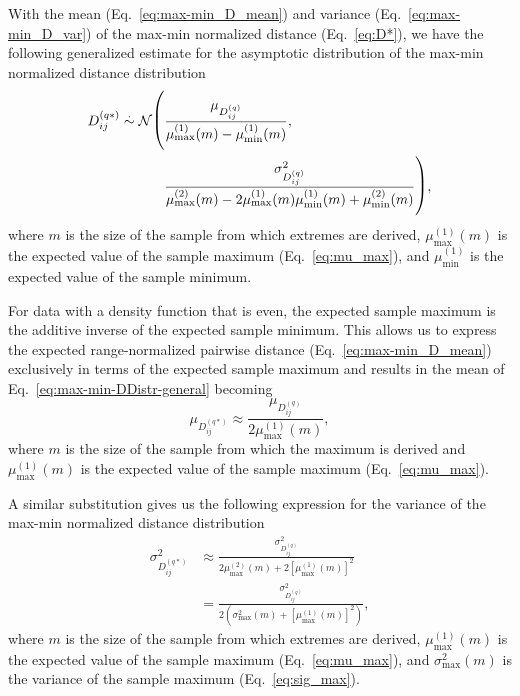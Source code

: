\documentclass[aos]{imsart}
\begin{document}
With the mean (Eq.~\ref{eq:max-min_D_mean}) and variance (Eq.~\ref{eq:max-min_D_var}) of the max-min normalized distance (Eq.~\ref{eq:D*}), we have the following generalized estimate for the asymptotic distribution of the max-min normalized distance distribution
%
\begin{equation}\label{eq:max-min-DDistr-general}
\begin{aligned}
D^{(q*)}_{ij} \overset{.}{\sim} \mathcal{N}{\fontsize{0.5cm}{1pt}\selectfont \Biggl(}&\frac{\mu_{D^{(q)}_{ij}}}{\mu^{(1)}_\text{max}(m) - \mu^{(1)}_\text{min}(m)}, \\
&\frac{\sigma^2_{D^{(q)}_{ij}}}{\mu^{(2)}_\text{max}(m) - 2 \mu^{(1)}_\text{max}(m) \mu^{(1)}_\text{min}(m) + \mu^{(2)}_\text{min}(m)}{\fontsize{0.5cm}{1pt}\selectfont \Biggr)},
\end{aligned}
\end{equation}
%
where $m$ is the size of the sample from which extremes are derived, $\mu^{(1)}_\text{max}(m)$ is the expected value of the sample maximum (Eq.~\ref{eq:mu_max}), and $\mu^{(1)}_\text{min}$ is the expected value of the sample minimum.

For data with a density function that is even, the expected sample maximum is the additive inverse of the expected sample minimum. This allows us to express the expected range-normalized pairwise distance (Eq.~\ref{eq:max-min_D_mean}) exclusively in terms of the expected sample maximum and results in the mean of Eq.~\ref{eq:max-min-DDistr-general} becoming
%
\begin{equation}\label{eq:max-min_D_mean_symm}
\mu_{D^{(q*)}_{ij}} \approx \frac{\mu_{D^{(q)}_{ij}}}{2\mu^{(1)}_\text{max}(m)},
\end{equation}
%
where $m$ is the size of the sample from which the maximum is derived and $\mu^{(1)}_\text{max}(m)$ is the expected value of the sample maximum (Eq.~\ref{eq:mu_max}).

A similar substitution gives us the following expression for the variance of the max-min normalized distance distribution
%
\begin{equation}\label{eq:max-min_D_var_symm}
\begin{aligned}
\sigma^2_{D^{(q*)}_{ij}} &\approx \frac{\sigma^2_{D^{(q)}_{ij}}}{2\mu^{(2)}_\text{max}(m) + 2\left[\mu^{(1)}_\text{max}(m)\right]^2} \\
&= \frac{\sigma^2_{D^{(q)}_{ij}}}{2\left(\sigma^2_\text{max}(m) + \left[\mu^{(1)}_\text{max}(m)\right]^2\right)},
\end{aligned}
\end{equation}
%
where $m$ is the size of the sample from which extremes are derived, $\mu^{(1)}_\text{max}(m)$ is the expected value of the sample maximum (Eq.~\ref{eq:mu_max}), and $\sigma^2_\text{max}(m)$ is the variance of the sample maximum (Eq.~\ref{eq:sig_max}).
\end{document}
